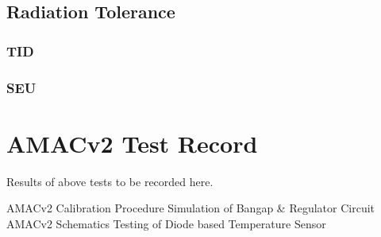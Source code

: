\documentclass[11pt]{article}   			%
\begin{document}
\subsection{Radiation Tolerance}

\subsubsection{TID}

\subsubsection{SEU}

\newpage

\section{AMACv2 Test Record}
Results of above tests to be recorded here.
\begin{thebibliography}{50}
 AMACv2 Calibration Procedure
 Simulation of Bangap {\&} Regulator Circuit
 AMACv2 Schematics
 Testing of Diode based Temperature Sensor
\end{thebibliography}
\end{document}
